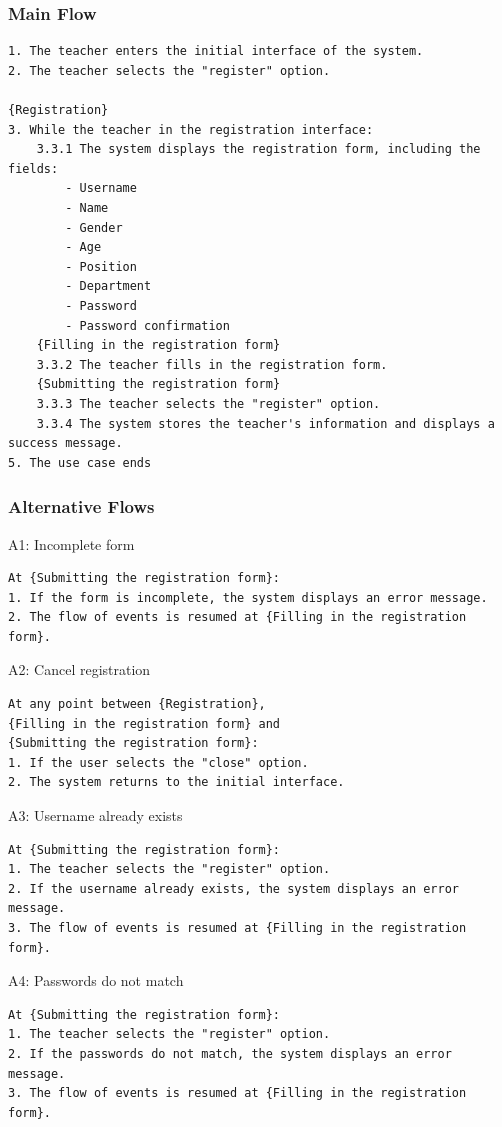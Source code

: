 \documentclass{article}
\begin{document}
\subsubsection{Main Flow}
\begin{verbatim}
1. The teacher enters the initial interface of the system.
2. The teacher selects the "register" option.

{Registration}
3. While the teacher in the registration interface:
    3.3.1 The system displays the registration form, including the fields:
        - Username
        - Name
        - Gender 
        - Age
        - Position 
        - Department 
        - Password
        - Password confirmation
    {Filling in the registration form}
    3.3.2 The teacher fills in the registration form.
    {Submitting the registration form}
    3.3.3 The teacher selects the "register" option.
    3.3.4 The system stores the teacher's information and displays a success message.
5. The use case ends 
\end{verbatim}


\subsubsection{Alternative Flows}
A1: Incomplete form
\begin{verbatim}
At {Submitting the registration form}:
1. If the form is incomplete, the system displays an error message.
2. The flow of events is resumed at {Filling in the registration form}.
\end{verbatim}

\noindent A2: Cancel registration
\begin{verbatim}
At any point between {Registration}, 
{Filling in the registration form} and 
{Submitting the registration form}:
1. If the user selects the "close" option.
2. The system returns to the initial interface.
\end{verbatim}

\noindent A3: Username already exists
\begin{verbatim}
At {Submitting the registration form}:
1. The teacher selects the "register" option.
2. If the username already exists, the system displays an error message.
3. The flow of events is resumed at {Filling in the registration form}.
\end{verbatim}

\noindent A4: Passwords do not match
\begin{verbatim}
At {Submitting the registration form}:
1. The teacher selects the "register" option.
2. If the passwords do not match, the system displays an error message.
3. The flow of events is resumed at {Filling in the registration form}.
\end{verbatim}
\end{document}
